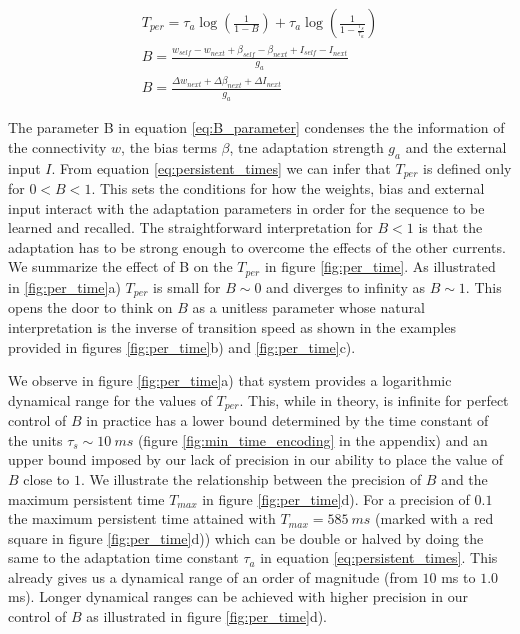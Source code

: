 \documentclass[10pt,a4paper]{article}
\begin{document}
\begin{align}
T_{per} = \tau_a \log \left(\frac{1}{1 - B} \right) + \tau_a \log \left( \frac{                                                                                                                                                                                     1}{1 - \frac{\tau_s}{\tau_a}} \right) \label{eq:persistent_times}  \\ 
B = \frac{w_{self} - w_{next} + \beta_{self} - \beta_{next}+ I_{self} - I_{next}}{g_a} \\ 
B = \frac{\Delta w_{next} + \Delta \beta_{next} + \Delta I_{next}}{g_a} \label{eq:B_parameter}
\end{align}


The parameter B in equation \ref{eq:B_parameter} condenses the the information of the connectivity $w$, the bias terms $\beta$, tne adaptation strength $g_a$ and the external input $I$. From equation \ref{eq:persistent_times} we can infer that $T_{per}$ is defined only for $0 < B < 1$. This sets the conditions for how the weights, bias and external input interact with the adaptation parameters in order for the sequence to be learned and recalled. The straightforward interpretation for $B < 1$ is that the adaptation has to be strong enough to overcome the effects of the other currents. We summarize the effect of B on the $T_{per}$ in figure \ref{fig:per_time}. As illustrated in \ref{fig:per_time}a) $T_{per}$ is small for $B \sim 0$ and diverges to infinity as $B \sim 1$. This opens the door to think on $B$ as a unitless parameter whose natural interpretation is the inverse of transition speed as shown in the examples provided in figures \ref{fig:per_time}b) and \ref{fig:per_time}c).

We observe in figure \ref{fig:per_time}a) that system provides a logarithmic dynamical range for the values of $T_{per}$. This, while in theory, is infinite for perfect control of $B$ in practice has a lower bound determined by the time constant of the units $\tau_s \sim 10 \: ms$  (figure \ref{fig:min_time_encoding} in the appendix) and an upper bound imposed by our lack of precision in our ability to place the value of $B$ close to $1$.  We illustrate the relationship between the precision of $B$ and the maximum persistent time $T_{max}$ in figure \ref{fig:per_time}d). For a precision of $0.1$ the maximum persistent time attained with $T_{max} = 585 \:ms$ (marked with a red square in figure \ref{fig:per_time}d)) which can be double or halved by doing the same to the adaptation time constant $\tau_a$ in equation \ref{eq:persistent_times}. This already gives us a dynamical range of an order of magnitude (from $10$ ms to $1.0$ ms). Longer dynamical ranges can be achieved with higher precision in our control of $B$ as illustrated in figure \ref{fig:per_time}d). 
\end{document}
